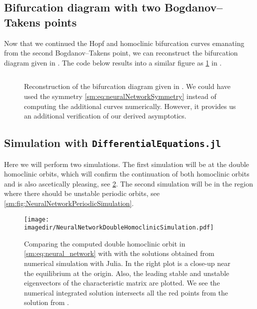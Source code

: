 \subsection{Bifurcation diagram with two Bogdanov--Takens points}
\label{sm:sec:neural_network_model:bifurcation_diagramII}
Now that we continued the Hopf and homoclinic bifurcation curves emanating from
the second Bogdanov--Takens point, we can reconstruct the bifurcation diagram
given in \cite[Figure 7]{giannakopoulos2001bifurcations}. The code below
results into a similar figure as \cref{sm:fig:NeuralNetworkCompareParametersII} in \MATLAB.
\inputminted[firstline=218, lastline=245]{MATLAB}{\pathToDDEBifToolDemos/neural_network_model/neural_network_model.m}
\begin{figure}[ht]
    \centering
    \caption{Reconstruction of the bifurcation diagram given in \cite[Figure
        7]{giannakopoulos2001bifurcations}. We could have used the symmetry
        \cref{sm:eq:neuralNetworkSymmetry} instead of computing the additional
        curves numerically. However, it provides us an additional verification of
        our derived asymptotics.}
    \label{sm:fig:NeuralNetworkCompareParametersII}
\end{figure}

\subsection{Simulation with {\tt DifferentialEquations.jl}}
Here we will perform two simulations. The first simulation will be at the
double homoclinic orbits, which will confirm the continuation of both
homoclinic orbits and is also ascetically pleasing, see \cref{sm:fig:NeuralNetworkSimulationHomoclinic}. The second simulation will
be in the region where there should be unstable periodic orbits, see \cref{sm:fig:NeuralNetworkPeriodicSimulation}.

\begin{figure}[ht]
    \texttt{[image: \\imagedir/NeuralNetworkDoubleHomoclinicSimulation.pdf]}
    \caption{Comparing the computed double homoclinic orbit in \cref{sm:eq:neural_network}
    with \DDEBIFTOOL with the solutions obtained from numerical simulation with Julia.
    In the right plot is a close-up near the equilibrium at the origin. Also, the
    leading stable and unstable eigenvectors of the characteristic matrix are plotted. We see the numerical integrated solution
    intersects all the red points from the solution from \DDEBIFTOOL.}
    \label{sm:fig:NeuralNetworkSimulationHomoclinic}
\end{figure}

